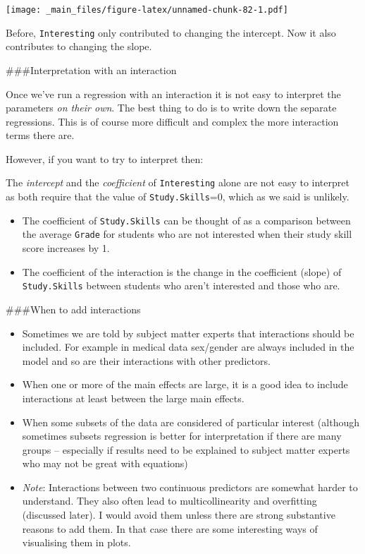 \documentclass[
]{gitbook}
\providecommand{\tightlist}{%
  \setlength{\itemsep}{0pt}\setlength{\parskip}{0pt}}
\begin{document}
\texttt{[image: \_main\_files/figure-latex/unnamed-chunk-82-1.pdf]}

Before, \texttt{Interesting} only contributed to changing the intercept. Now it also contributes to changing the slope.

\#\#\#Interpretation with an interaction

Once we've run a regression with an interaction it is not easy to interpret the parameters \emph{on their own}. The best thing to do is to write down the separate regressions. This is of course more difficult and complex the more interaction terms there are.

However, if you want to try to interpret then:

The \emph{intercept} and the \emph{coefficient} of \texttt{Interesting} alone are not easy to interpret as both require that the value of \texttt{Study.Skills}=0, which as we said is unlikely.

\begin{itemize}
\tightlist
\item
  The coefficient of \texttt{Study.Skills} can be thought of as a comparison between the average \texttt{Grade} for students who are not interested when their study skill score increases by 1.
\item
  The coefficient of the interaction is the change in the coefficient (slope) of \texttt{Study.Skills} between students who aren't interested and those who are.
\end{itemize}

\#\#\#When to add interactions

\begin{itemize}
\tightlist
\item
  Sometimes we are told by subject matter experts that interactions should be included. For example in medical data sex/gender are always included in the model and so are their interactions with other predictors.
\item
  When one or more of the main effects are large, it is a good idea to include interactions at least between the large main effects.
\item
  When some subsets of the data are considered of particular interest (although sometimes subsets regression is better for interpretation if there are many groups -- especially if results need to be explained to subject matter experts who may not be great with equations)
\item
  \emph{Note}: Interactions between two continuous predictors are somewhat harder to understand. They also often lead to multicollinearity and overfitting (discussed later). I would avoid them unless there are strong substantive reasons to add them. In that case there are some interesting ways of visualising them in plots.
\end{itemize}
\end{document}
